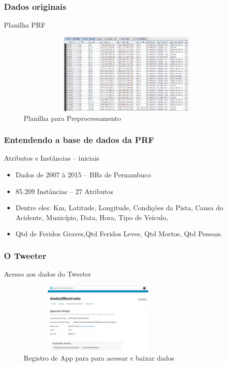\documentclass[11pt]{beamer}
\begin{document}

\begin{frame}\frametitle{ Dados originais}
	\transboxin[duration=2, direction=25]	
	\begin{block}{ Planilha PRF}
		\begin{figure}[!ht]
			\centering %
			\caption{Planilha para Preprocessamento}
			\includegraphics[width=110mm, height=40mm]{Figuras/BigData/PlanilhaPRF.png}
		\end{figure}
	\end{block}
\end{frame}


\begin{frame}\frametitle{ Entendendo a base de dados da PRF}
	\begin{exampleblock}{ Atributos e Instâncias -- iniciais}
		\begin{itemize}
			\item Dados de 2007 à 2015 -- BRs de Pernambuco
			\pause
			\item 85.209 Instâncias -- 27 Atributos
			\pause
			\item Dentre eles: Km, Latitude, Longitude, Condições da Pista, Causa do Acidente, Município, Data, Hora, Tipo de Veículo, 
			\pause
			\item Qtd de Feridos Graves,Qtd Feridos Leves, Qtd Mortos, Qtd Pessoas.
			
		\end{itemize}
	\end{exampleblock}
\end{frame}

\begin{frame}\frametitle{ O Tweeter}
	\begin{block}{ Acesso aos dados do Tweeter}
		\begin{figure}[!ht]
			\centering %
			\caption{Registro de App para para acessar e baixar dados}
			\includegraphics[width=80mm, height=35mm]{Figuras/BigData/appTweeter.png}
		\end{figure}
	\end{block}
\end{frame}
\end{document}
